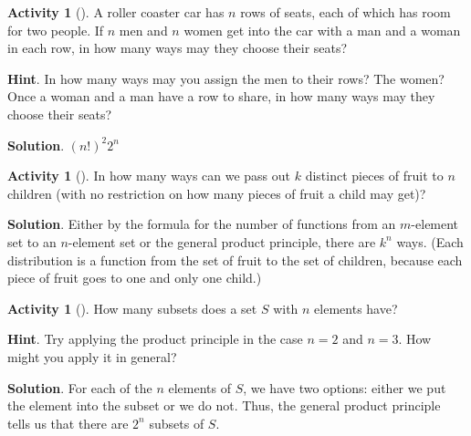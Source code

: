 \documentclass[10pt,]{book}
\theoremstyle{plain}
\theoremstyle{definition}
\theoremstyle{definition}
\theoremstyle{definition}
\newtheorem{activity}[project]{Activity}
\theoremstyle{definition}
\numberwithin{equation}{chapter}
\begin{document}
\begin{activity}[]\label{activity-30}
\hypertarget{p-545}{}%
A roller coaster car has \(n\) rows of seats, each of which has room for two people. If \(n\) men and \(n\) women get into the car with a man and a woman in each row, in how many ways may they choose their seats?%
\par\smallskip%
\noindent\textbf{Hint}.\hypertarget{hint-18}{}\quad%
\hypertarget{p-546}{}%
In how many ways may you assign the men to their rows? The women? Once a woman and a man have a row to share, in how many ways may they choose their seats?%
\par\smallskip%
\noindent\textbf{Solution}.\hypertarget{solution-41}{}\quad%
\hypertarget{p-547}{}%
\((n!)^2 2^n\)%
\end{activity}
\begin{activity}[]\label{activity-31}
\hypertarget{p-548}{}%
In how many ways can we pass out \(k\) distinct pieces of fruit to \(n\) children (with no restriction on how many pieces of fruit a child may get)?%
\par\smallskip%
\noindent\textbf{Solution}.\hypertarget{solution-42}{}\quad%
\hypertarget{p-549}{}%
Either by the formula for the number of functions from an \(m\)-element set to an \(n\)-element set or the general product principle, there are \(k^n\) ways. (Each distribution is a function from the set of fruit to the set of children, because each piece of fruit goes to one and only one child.)%
\end{activity}
\begin{activity}[]\label{SubsetsFirstTime}
\hypertarget{p-550}{}%
How many subsets does a set \(S\) with \(n\) elements have?%
\par\smallskip%
\noindent\textbf{Hint}.\hypertarget{hint-19}{}\quad%
\hypertarget{p-551}{}%
Try applying the product principle in the case \(n = 2\) and \(n = 3\). How might you apply it in general?%
\par\smallskip%
\noindent\textbf{Solution}.\hypertarget{solution-43}{}\quad%
\hypertarget{p-552}{}%
For each of the \(n\) elements of \(S\), we have two options: either we put the element into the subset or we do not. Thus, the general product principle tells us that there are \(2^n\) subsets of \(S\).%
\end{activity}
\end{document}

